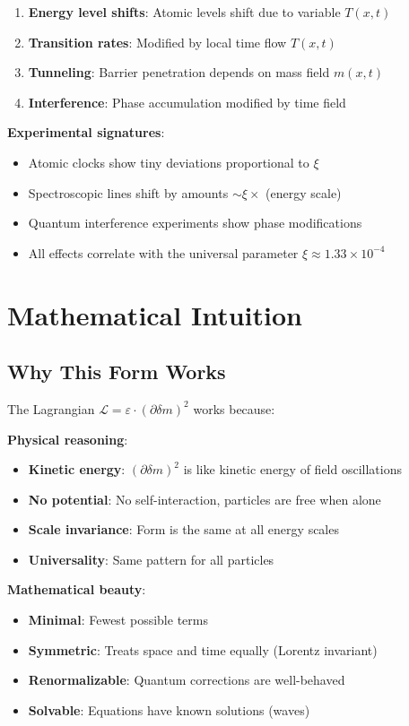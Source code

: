 \documentclass[12pt,a4paper]{article}
\newcommand{\deltam}{\delta m}
\newcommand{\Lag}{\mathcal{L}}
\newcommand{\xipar}{\xi}
\theoremstyle{definition}
\theoremstyle{remark}
\begin{document}
	\begin{enumerate}
		\item \textbf{Energy level shifts}: Atomic levels shift due to variable $T(x,t)$
		\item \textbf{Transition rates}: Modified by local time flow $T(x,t)$
		\item \textbf{Tunneling}: Barrier penetration depends on mass field $m(x,t)$
		\item \textbf{Interference}: Phase accumulation modified by time field
	\end{enumerate}
	
	\textbf{Experimental signatures}:
	\begin{itemize}
		\item Atomic clocks show tiny deviations proportional to $\xipar$
		\item Spectroscopic lines shift by amounts $\sim \xipar \times$ (energy scale)
		\item Quantum interference experiments show phase modifications
		\item All effects correlate with the universal parameter $\xipar \approx 1.33 \times 10^{-4}$
	\end{itemize}
	

	\section{Mathematical Intuition}
	
	\subsection{Why This Form Works}
	
	The Lagrangian $\Lag = \varepsilon \cdot (\partial \deltam)^2$ works because:
	
	\textbf{Physical reasoning}:
	\begin{itemize}
		\item \textbf{Kinetic energy}: $(\partial \deltam)^2$ is like kinetic energy of field oscillations
		\item \textbf{No potential}: No self-interaction, particles are free when alone
		\item \textbf{Scale invariance}: Form is the same at all energy scales
		\item \textbf{Universality}: Same pattern for all particles
	\end{itemize}
	
	\textbf{Mathematical beauty}:
	\begin{itemize}
		\item \textbf{Minimal}: Fewest possible terms
		\item \textbf{Symmetric}: Treats space and time equally (Lorentz invariant)
		\item \textbf{Renormalizable}: Quantum corrections are well-behaved
		\item \textbf{Solvable}: Equations have known solutions (waves)
	\end{itemize}
	
\end{document}
